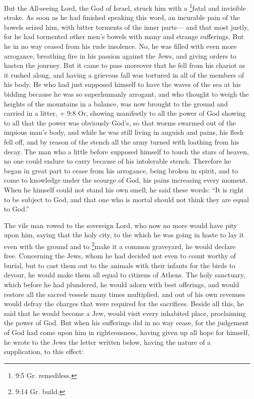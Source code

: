  But the All-seeing Lord, the God of Israel, struck him with
a \footnote{9:5 Gr. remediless.}fatal and invisible stroke. As soon as
he had finished speaking this word, an incurable pain of the bowels
seized him, with bitter torments of the inner parts---  and
that most justly, for he had tormented other men's bowels with many and
strange sufferings.  But he in no way ceased from his rude
insolence. No, he was filled with even more arrogance, breathing fire in
his passion against the Jews, and giving orders to hasten the journey.
But it came to pass moreover that he fell from his chariot as it rushed
along, and having a grievous fall was tortured in all of the members of
his body.  He who had just supposed himself to have the
waves of the sea at his bidding because he was so superhumanly arrogant,
and who thought to weigh the heights of the mountains in a balance, was
now brought to the ground and carried in a litter, + 9:8 Or, showing
manifestly to all the power of God showing to all that the power was
obviously God's,  so that worms swarmed out of the impious
man's body, and while he was still living in anguish and pains, his
flesh fell off, and by reason of the stench all the army turned with
loathing from his decay.  The man who a little before
supposed himself to touch the stars of heaven, no one could endure to
carry because of his intolerable stench.  Therefore he
began in great part to cease from his arrogance, being broken in spirit,
and to come to knowledge under the scourge of God, his pains increasing
every moment.  When he himself could not stand his own
smell, he said these words: ``It is right to be subject to God, and that
one who is mortal should not think they are equal to God.''

 The vile man vowed to the sovereign Lord, who now no more
would have pity upon him, saying  that the holy city, to
the which he was going in haste to lay it even with the ground and to
\footnote{9:14 Gr. build.}make it a common graveyard, he would declare
free.  Concerning the Jews, whom he had decided not even to
count worthy of burial, but to cast them out to the animals with their
infants for the birds to devour, he would make them all equal to
citizens of Athens.  The holy sanctuary, which before he
had plundered, he would adorn with best offerings, and would restore all
the sacred vessels many times multiplied, and out of his own revenues
would defray the charges that were required for the sacrifices.
 Beside all this, he said that he would become a Jew, would
visit every inhabited place, proclaiming the power of God. 
But when his sufferings did in no way cease, for the judgement of God
had come upon him in righteousness, having given up all hope for
himself, he wrote to the Jews the letter written below, having the
nature of a supplication, to this effect:

